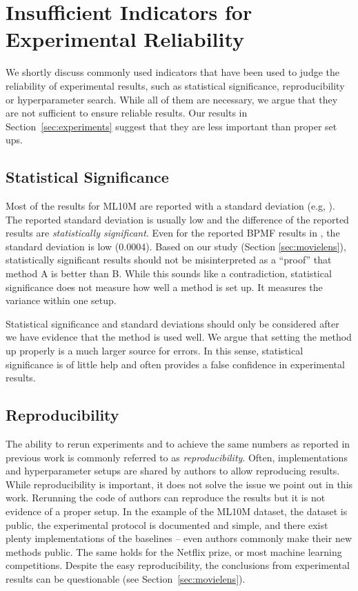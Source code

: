 \documentclass{article}
\begin{document}
\section{Insufficient Indicators for Experimental Reliability}

We shortly discuss commonly used indicators that have been used to judge the reliability of experimental results, such as statistical significance, reproducibility or hyperparameter search.
While all of them are necessary, we argue that they are not sufficient to ensure reliable results.
Our results in Section~\ref{sec:experiments} suggest that they are less important than proper set ups.

\subsection{Statistical Significance}

Most of the results for ML10M are reported with a standard deviation (e.g, \cite{strub:arxiv16,li:nips17}).
The reported standard deviation is usually low and the difference of the reported results are \emph{statistically significant}.
Even for the reported BPMF results in \cite{li:nips17}, the standard deviation is low (0.0004).
Based on our study (Section \ref{sec:movielens}), statistically significant results should not be misinterpreted as a ``proof'' that method A is better than B.
While this sounds like a contradiction, statistical significance does not measure how well a method is set up.
It measures the variance within one setup.

Statistical significance and standard deviations should only be considered after we have evidence that the method is used well.
We argue that setting the method up properly is a much larger source for errors.
In this sense, statistical significance is of little help and often provides a false confidence in experimental results.

\subsection{Reproducibility}

The ability to rerun experiments and to achieve the same numbers as reported in previous work is commonly referred to as \emph{reproducibility}.
Often, implementations and hyperparameter setups are shared by authors to allow reproducing results.
While reproducibility is important, it does not solve the issue we point out in this work.
Rerunning the code of authors can reproduce the results but it is not evidence of a proper setup.
In the example of the ML10M dataset, the dataset is public, the experimental protocol is documented and simple, and there exist plenty implementations of the baselines -- even authors commonly make their new methods public.
The same holds for the Netflix prize, or most machine learning competitions.
Despite the easy reproducibility, the conclusions from experimental results can be questionable (see Section~\ref{sec:movielens}).
\end{document}
